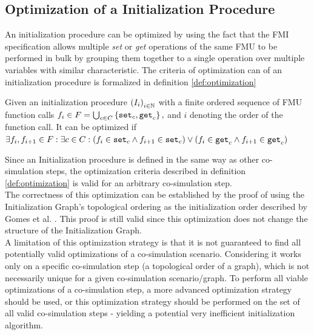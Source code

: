 \documentclass[runningheads]{llncs}
\begin{document}
\subsection{Optimization of a Initialization Procedure}
An initialization procedure can be optimized by using the fact that the FMI specification allows multiple \textit{set} or \textit{get} operations of the same FMU to be performed in bulk by grouping them together to a single operation over multiple variables with similar characteristic. The criteria of optimization can of an initialization procedure is formalized in definition \ref{def:optimization}
\begin{definition}\label{def:optimization}
  Given an initialization procedure $ \left( I_i \right)_{i \in \mathbb{N}}$ with a finite ordered sequence of FMU function calls $f_i \in F = \bigcup_{c \in C}  \left\{ \mathtt{set}_{c},\mathtt{get}_{c} \right\},$ and $i$ denoting the order of the function call. It can be optimized if $\exists f_i, f_{i +1} \in F : \exists c \in C :(f_i \in {\mathtt{set}_{c}} \land f_{i+1} \in {\mathtt{set}_{c}}) \lor (f_i \in {\mathtt{get}_{c}} \land f_{i+1} \in {\mathtt{get}_{c}})$
\end{definition}
Since an Initialization procedure is defined in the same way as other co-simulation steps, the optimization criteria described in definition \ref{def:optimization} is valid for an arbitrary co-simulation step. \\
The correctness of this optimization can be established by the proof of using the Initialization Graph's topological ordering as the initialization order described by Gomes et al. \cite{Gomes2019}. This proof is still valid since this optimization does not change the structure of the Initialization Graph. \\
A limitation of this optimization strategy is that it is not guaranteed to find all potentially valid optimizations of a co-simulation scenario. Considering it works only on a specific co-simulation step (a topological order of a graph), which is not necessarily unique for a given co-simulation scenario/graph. To perform all viable optimizations of a co-simulation step, a more advanced optimization strategy should be used, or this optimization strategy should be performed on the set of all valid co-simulation steps - yielding a potential very inefficient initialization algorithm.


\end{document}
